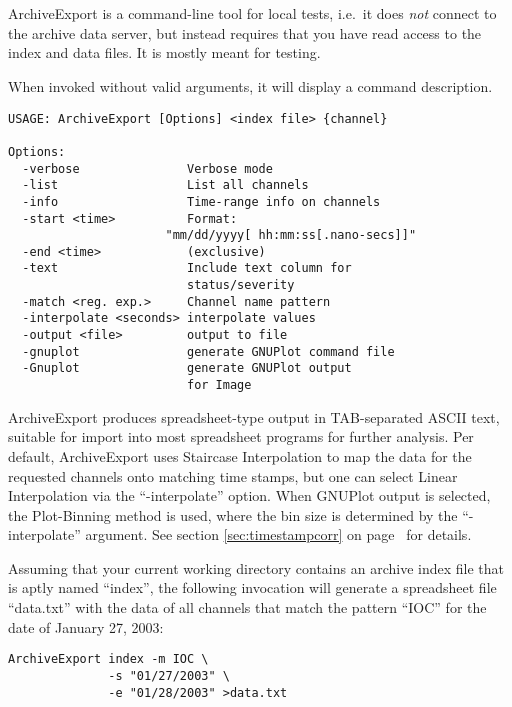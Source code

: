 \section{}
ArchiveExport is a command-line tool for local tests, i.e.\ it does
\emph{not} connect to the archive data server, but instead requires that
you have read access to the index and data files.
It is mostly meant for testing.

When invoked without valid arguments, it will display a command
description.

\begin{lstlisting}[frame=none,keywordstyle=\sffamily]
USAGE: ArchiveExport [Options] <index file> {channel}
 
Options:
  -verbose               Verbose mode
  -list                  List all channels
  -info                  Time-range info on channels
  -start <time>          Format:
                      "mm/dd/yyyy[ hh:mm:ss[.nano-secs]]"
  -end <time>            (exclusive)
  -text                  Include text column for
                         status/severity
  -match <reg. exp.>     Channel name pattern
  -interpolate <seconds> interpolate values
  -output <file>         output to file
  -gnuplot               generate GNUPlot command file
  -Gnuplot               generate GNUPlot output
                         for Image
\end{lstlisting}

\noindent ArchiveExport produces spreadsheet-type output in
TAB-separated ASCII text, suitable for import into most spreadsheet
programs for further analysis. Per default, ArchiveExport uses
Staircase Interpolation to map the data for the requested channels
onto matching time stamps, but one can select Linear Interpolation via
the ``-interpolate'' option. When GNUPlot output is selected, the
Plot-Binning method is used, where the bin size is determined by the
``-interpolate'' argument. See section \ref{sec:timestampcorr} on
page~\pageref{sec:timestampcorr} for details.

Assuming that your current working directory contains an
archive index file that is aptly named ``index'', the following
invocation will generate a spreadsheet file ``data.txt'' with the data
of all channels that match the pattern ``IOC'' for the date of January
27, 2003:

\begin{lstlisting}[frame=none,keywordstyle=\sffamily]
ArchiveExport index -m IOC \
              -s "01/27/2003" \
              -e "01/28/2003" >data.txt
\end{lstlisting}


